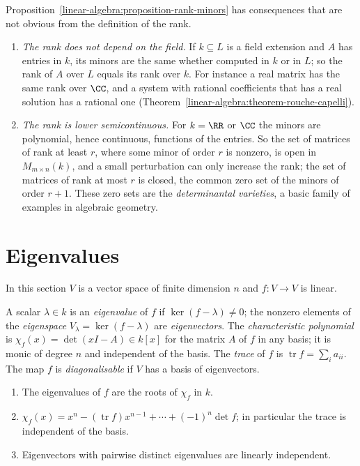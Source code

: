 \begin{remark}\label{linear-algebra:remark-rank-minors}
Proposition~\ref{linear-algebra:proposition-rank-minors} has consequences that are not obvious from the definition of the rank.
\begin{enumerate}
\item \emph{The rank does not depend on the field.} If $k \subseteq L$ is a field extension and $A$ has entries in $k$, its minors are the same whether computed in $k$ or in $L$; so the rank of $A$ over $L$
equals its rank over $k$. For instance a real matrix has the same rank over $\CC$, and a system with rational coefficients that has a real solution has a rational one (Theorem~\ref{linear-algebra:theorem-rouche-capelli}).
\item \emph{The rank is lower semicontinuous.} For $k = \RR$ or $\CC$ the minors are polynomial, hence continuous, functions of the entries. So the set of matrices of rank at least $r$, where some minor
of order $r$ is nonzero, is open in $M_{m \times n}(k)$, and a small perturbation can only increase the rank; the set of matrices of rank at most $r$ is closed, the common zero set of the minors of
order $r + 1$. These zero sets are the \emph{determinantal varieties}, a basic family of examples in algebraic geometry.
\end{enumerate}
\end{remark}

\section{Eigenvalues}\label{linear-algebra:section-eigenvalues}

In this section $V$ is a vector space of finite dimension $n$ and $f \colon V \to V$ is linear.

\begin{definition}\label{linear-algebra:definition-eigen}
A scalar $\lambda \in k$ is an \emph{eigenvalue} of $f$ if $\ker(f - \lambda) \neq 0$; the nonzero elements of
the \emph{eigenspace} $V_\lambda = \ker(f - \lambda)$ are \emph{eigenvectors}. The \emph{characteristic
polynomial} is $\chi_f(x) = \det(xI - A) \in k[x]$ for the matrix $A$ of $f$ in any basis; it is monic of
degree $n$ and independent of the basis. The \emph{trace} of $f$ is $\operatorname{tr} f = \sum_i a_{ii}$. The map
$f$ is \emph{diagonalisable} if $V$ has a basis of eigenvectors.
\end{definition}

\begin{proposition}\label{linear-algebra:proposition-eigen-basics}
\begin{enumerate}
\item The eigenvalues of $f$ are the roots of $\chi_f$ in $k$.
\item $\chi_f(x) = x^n - (\operatorname{tr} f)x^{n-1} + \cdots + (-1)^n\det f$; in particular the trace is
independent of the basis.
\item Eigenvectors with pairwise distinct eigenvalues are linearly independent.
\end{enumerate}
\end{proposition}

